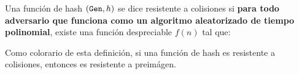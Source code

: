 Una función de hash $(\texttt{Gen}, h)$ se dice resistente a colisiones si \textbf{para todo adversario que funciona como un algoritmo aleatorizado de tiempo polinomial}, existe una función despreciable $f(n)$ tal que:

Como colorario de esta definición, si una función de hash es resistente a colisiones, entonces es resistente a preimágen.



